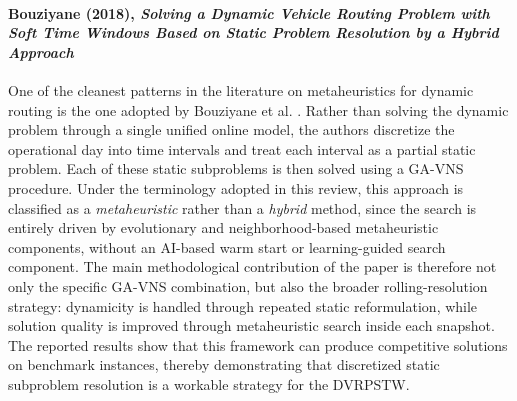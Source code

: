

\paragraph{Bouziyane (2018), \textit{Solving a Dynamic Vehicle Routing Problem with Soft Time Windows Based on Static Problem Resolution by a Hybrid Approach}}
One of the cleanest patterns in the literature on metaheuristics for dynamic routing 
is the one adopted by Bouziyane et al. \cite{bouziyane2018SolvingDynamicVehicle}. 
Rather than solving the dynamic problem through a single unified online model, the authors discretize 
the operational day into time intervals and treat each interval as a partial static problem. 
Each of these static subproblems is then solved using a GA-VNS procedure. Under the terminology adopted
in this review, this approach is classified as a \emph{metaheuristic} rather than a \emph{hybrid} method,
since the search is entirely driven by evolutionary and neighborhood-based metaheuristic components,
without an AI-based warm start or learning-guided search component. The main methodological contribution
of the paper is therefore not only the specific GA-VNS combination, but also the broader rolling-resolution
strategy: dynamicity is handled through repeated static reformulation, while solution quality is improved 
through metaheuristic search inside each snapshot. The reported results show that this framework can produce 
competitive solutions on benchmark instances, thereby demonstrating that discretized static subproblem 
resolution is a workable strategy for the DVRPSTW.

